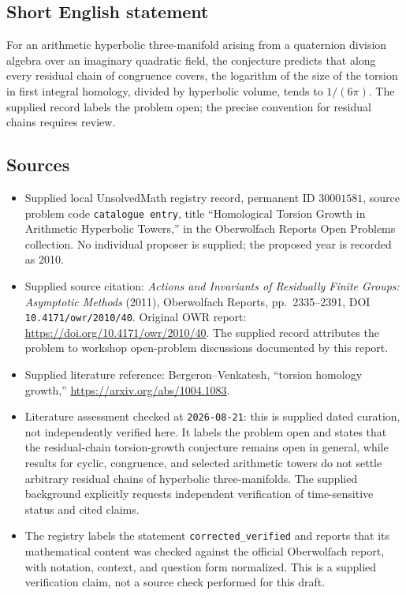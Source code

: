 \documentclass[11pt]{article}
\begin{document}
\subsection{Short English statement}
For an arithmetic hyperbolic three-manifold arising from a quaternion division algebra over an imaginary quadratic field, the conjecture predicts that along every residual chain of congruence covers, the logarithm of the size of the torsion in first integral homology, divided by hyperbolic volume, tends to \(1/(6\pi)\). The supplied record labels the problem open; the precise convention for residual chains requires review.
\subsection{Sources}
\begin{itemize}
\item Supplied local UnsolvedMath registry record, permanent ID \(30001581\), source problem code \texttt{catalogue entry}, title ``Homological Torsion Growth in Arithmetic Hyperbolic Towers,'' in the Oberwolfach Reports Open Problems collection. No individual proposer is supplied; the proposed year is recorded as 2010.
\item Supplied source citation: \emph{Actions and Invariants of Residually Finite Groups: Asymptotic Methods} (2011), Oberwolfach Reports, pp.~2335--2391, DOI \texttt{10.4171/owr/2010/40}. Original OWR report: \url{https://doi.org/10.4171/owr/2010/40}. The supplied record attributes the problem to workshop open-problem discussions documented by this report.
\item Supplied literature reference: Bergeron--Venkatesh, ``torsion homology growth,'' \url{https://arxiv.org/abs/1004.1083}.
\item Literature assessment checked at \texttt{2026-08-21}: this is supplied dated curation, not independently verified here. It labels the problem open and states that the residual-chain torsion-growth conjecture remains open in general, while results for cyclic, congruence, and selected arithmetic towers do not settle arbitrary residual chains of hyperbolic three-manifolds. The supplied background explicitly requests independent verification of time-sensitive status and cited claims.
\item The registry labels the statement \texttt{corrected\_verified} and reports that its mathematical content was checked against the official Oberwolfach report, with notation, context, and question form normalized. This is a supplied verification claim, not a source check performed for this draft.
\end{itemize}
\end{document}
